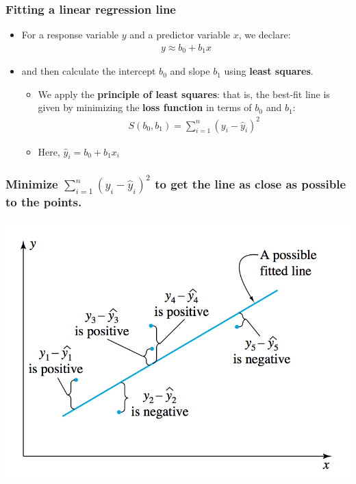 \documentclass[handout]{beamer}\usepackage{graphicx, color}
\providecommand{\wh}[1]{\widehat{#1}}
\numberwithin{equation}{section}
\begin{document}
\begin{frame}
\frametitle{Fitting a linear regression line}
\begin{itemize}
\item For a response variable $y$ and a predictor variable $x$, we declare:
\begin{align*}
y \approx b_0 + b_1 x
\end{align*}
\pause \item and then calculate the intercept $b_0$ and slope $b_1$ using {\bf least squares}.
\begin{itemize}
\pause \item We apply the {\bf principle of least squares}: that is, the best-fit line is given by minimizing the {\bf loss function} in terms of $b_0$ and $b_1$:
\pause \begin{align*}
S(b_0, b_1) = \sum_{i = 1}^n (y_i - \wh{y}_i)^2
\end{align*} 
\item Here, $\wh{y}_i  = b_0 + b_1 x_i$
\end{itemize}
\end{itemize}
\end{frame}


\begin{frame}
\frametitle{\small Minimize $\sum_{i = 1}^n (y_i - \wh{y}_i)^2$ to get the line as close as possible to the points.}
 \includegraphics{../../fig/lossfunplot.png}
\end{frame}
\end{document}

